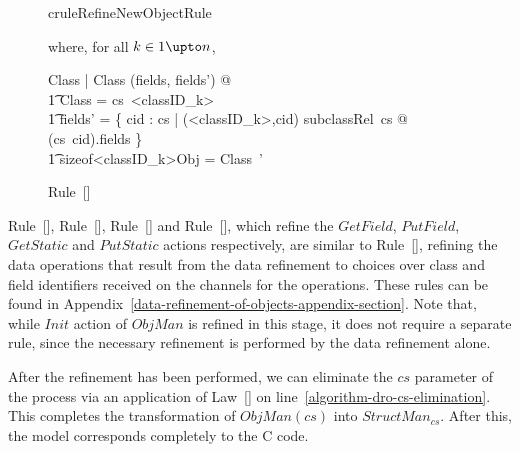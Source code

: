\begin{figure}[thp]
\begin{restatable}{crule}{RefineNewObjectRule}
\begin{circus}
    \end{circus}
    where, for all $k \in 1 \upto n$,
    \begin{circus} 
        \exists \Delta Class | \Xi Class \hide (fields, fields') @ \\
        \t1 \theta Class = cs~{<}classID_k{>} \land \\
        \t1 fields' = \bigcup \{ cid : \dom cs | ({<}classID_k{>},cid) \in subclassRel~cs @ (cs~cid).fields \} \land  \\
        \t1 sizeof{<}classID_k{>}Obj = \theta Class~'\\
    \end{circus}
  \end{restatable}
  \caption{Rule~[]}
  \label{refine-NewObject-rule-figure}
\end{figure}

Rule~[],
Rule~[],
Rule~[] and
Rule~[], which refine the $GetField$,
$PutField$, $GetStatic$ and $PutStatic$ actions respectively, are
similar to Rule~[], refining the data
operations that result from the data refinement to choices over class
and field identifiers received on the channels for the operations.
These rules can be found in
Appendix~\ref{data-refinement-of-objects-appendix-section}.
Note that, while $Init$ action of $ObjMan$ is refined in this stage,
it does not require a separate rule, since the necessary refinement is
performed by the data refinement alone.

After the refinement has been performed, we can eliminate the $cs$
parameter of the process via an application of
Law~[] on
line~\ref{algorithm-dro-cs-elimination}.
This completes the transformation of $ObjMan(cs)$ into
$StructMan_{cs}$.
After this, the model corresponds completely to the C code.
